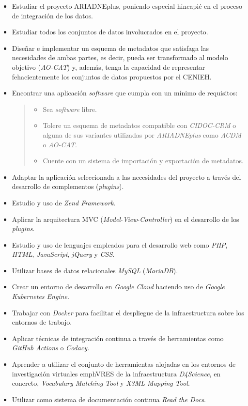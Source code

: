 \begin{itemize}
\tightlist
\item
  Estudiar el proyecto ARIADNEplus, poniendo especial hincapié en el
  proceso de integración de los datos.
\item
  Estudiar todos los conjuntos de datos involucrados en el proyecto.
\item
  Diseñar e implementar un esquema de metadatos que satisfaga las
  necesidades de ambas partes, es decir, pueda ser transformado al
  modelo objetivo (\emph{AO-CAT}) y, además, tenga la capacidad de
  representar fehacientemente los conjuntos de datos propuestos por el
  CENIEH.
\item
  Encontrar una aplicación \emph{software} que cumpla con un mínimo de
  requisitos:

  \begin{quote}
  \begin{itemize}
  \tightlist
  \item
    Sea \emph{software} libre.
  \item
    Tolere un esquema de metadatos compatible con \emph{CIDOC-CRM} o
    alguna de sus variantes utilizadas por \emph{ARIADNEplus} como \emph{ACDM}
    o \emph{AO-CAT}.
  \item
    Cuente con un sistema de importación y exportación de metadatos.
  \end{itemize}
  \end{quote}
\item
  Adaptar la aplicación seleccionada a las necesidades del proyecto a
  través del desarrollo de complementos (\emph{plugins}).
\item
  Estudio y uso de \emph{Zend Framework}.
\item
  Aplicar la arquitectura MVC
  (\emph{Model}-\emph{View}-\emph{Controller}) en el desarrollo de los
  \emph{plugins}.
\item
  Estudio y uso de lenguajes empleados para el desarrollo web como
  \emph{PHP}, \emph{HTML}, \emph{JavaScript}, \emph{jQuery} y
  \emph{CSS}.
\item
  Utilizar bases de datos relacionales \emph{MySQL} (\emph{MariaDB}).
\item
  Crear un entorno de desarrollo en \emph{Google Cloud} haciendo uso de \emph{Google Kubernetes Engine}.
\item
  Trabajar con \emph{Docker} para facilitar el despliegue de la
  infraestructura sobre los entornos de trabajo.
\item
  Aplicar técnicas de integración continua a través de herramientas como
  \emph{GitHub Actions} o \emph{Codacy}.
\item
  Aprender a utilizar el conjunto de herramientas alojadas en los entornos de investigación
  virtuales emph{VRES} de la infraestructura \emph{D4Science}, en concreto, \emph{Vocabulary
  Matching Tool} y \emph{X3ML Mapping Tool}.
\item
  Utilizar como sistema de documentación continua \emph{Read the Docs}.
\end{itemize}


